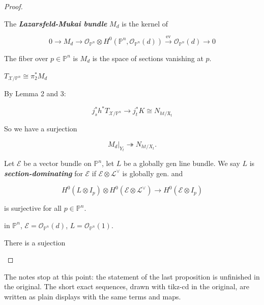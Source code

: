 \begin{proof}
\begin{definition}
\label{definition-mioranci-2}
The \textit{\textbf{Lazarsfeld-Mukai bundle}}
$M_d$ is the kernel of

$$
0\to M_d\to \mathcal{O}_{\mathbb{P}^n}\otimes
H^{0}(\mathbb{P}^n ,
\mathcal{O}_{\mathbb{P}^n}(d))\xrightarrow{
\operatorname{ev}}\mathcal{O}_{
\mathbb{P}^n}(d)\to
0
$$

\end{definition}

\begin{remark}
\label{remark-mioranci-4}
The fiber over $p \in \mathbb{P}^n$ is $M_d$
is the space of sections vanishing at $p$.
\end{remark}

\medskip{}
$T_{\mathcal{X}/\mathbb{P}^n}\cong \pi
^*_2M_d$

By Lemma 2 and 3:

$$
j^*_sh^*
T_{\mathcal{X}/\mathbb{P}^n}\longrightarrow
j^* _t K\cong N_{ht/\mathfrak{X}_t}
$$

So we have a surjection

$$
M_d|_{Y_t}\twoheadrightarrow N_{ht/X_t}.
$$

\begin{definition}
\label{definition-mioranci-3}
Let $\mathcal{E}$ be a vector bundle on
$\mathbb{P}^n$, let $L$ be a globally gen
line bundle. We say $L$ is
\textit{\textbf{section-dominating}} for
$\mathcal{E}$ if $\mathcal{E} \otimes
\mathcal{L}^\vee$ is globally gen. and

$$
H^{0}(L \otimes I_p)\otimes H^{0}(\mathcal{E}
\otimes \mathcal{L}^\vee)\longrightarrow
H^{0}(\mathcal{E} \otimes I_p)
$$

is surjective for all $p \in \mathbb{P}^n$.
\end{definition}

\begin{example}
\label{example-mioranci-1}
in $\mathbb{P}^n$,
$\mathcal{E}=\mathcal{O}_{\mathbb{P}^n}(d)$,
$L=\mathcal{O}_{\mathbb{P}^n}(1)$.
\end{example}

\begin{proposition}
\label{proposition-mioranci-1}
There is a sujection
\end{proposition}

\end{proof}

\medskip{} The
notes stop at this point: the statement of
the last proposition is unfinished in the
original. The short exact sequences, drawn
with tikz-cd in the original, are written as
plain displays with the same terms and maps.

